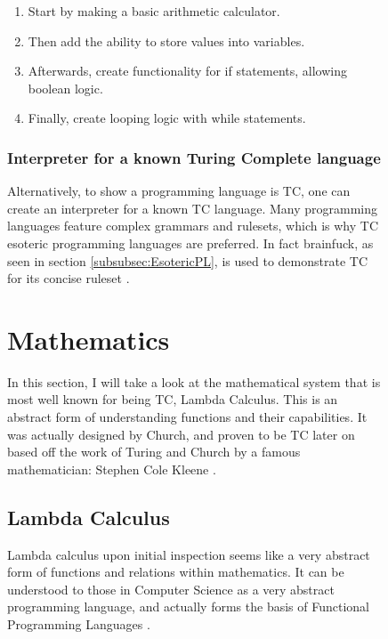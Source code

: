 \begin{figure}[htb]
\begin{enumerate}
    \item Start by making a basic arithmetic calculator.
    \item Then add the ability to store values into variables.
    \item Afterwards, create functionality for if statements, allowing boolean logic.
    \item Finally, create looping logic with while statements.
\end{enumerate}

\subsubsection{Interpreter for a known Turing Complete language}\label{subsec:InterpreterTC}

Alternatively, to show a programming language is TC, one can create an interpreter for a known TC language.
Many programming languages feature complex grammars and rulesets, which is why TC esoteric programming languages are preferred.
In fact brainfuck, as seen in section \ref{subsubsec:EsotericPL}, is used to demonstrate TC for its concise ruleset \cite{CBfInter,MeepWebsite,MeepGH,PythonBfInt}.

\section{Mathematics}\label{sec:Maths}

In this section, I will take a look at the mathematical system that is most well known for being TC, Lambda Calculus.
This is an abstract form of understanding functions and their capabilities.
It was actually designed by Church, and proven to be TC later on based off the work of Turing and Church by a famous mathematician: Stephen Cole Kleene \cite{LambdaCalcKleene}.

\subsection{Lambda Calculus}\label{subsec:LambdaCalc}

Lambda calculus upon initial inspection seems like a very abstract form of functions and relations within mathematics.
It can be understood to those in Computer Science as a very abstract programming language, and actually forms the basis of Functional Programming Languages \cite{TutLambdaCalc,FuncProgrChap}.


\end{figure}
